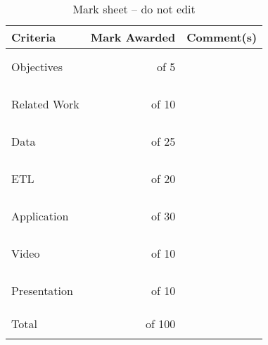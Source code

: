 
\newcommand{\criteria}[2]{& & \\ & & \\ #1 & of #2 & \\ & & \\ & & \\\hline}
\newcommand{\total}[1]{\hline\hline  & & \\ Total & of #1 & \\ & &  \\\hline\hline}

\begin{table}[h]
\centering
\caption{Mark sheet -- do not edit}
\begin{tabular}{||l|r|p{10cm}||}
\hline\hline
Criteria & Mark Awarded & Comment(s) \\
\hline\hline
\criteria{Objectives}{5}
\criteria{Related Work}{10}
\criteria{Data}{25}
\criteria{ETL}{20}
\criteria{Application}{30}
\criteria{Video}{10}
\criteria{Presentation}{10}
\hline
\total{100}
\hline
\end{tabular}
\end{table}




